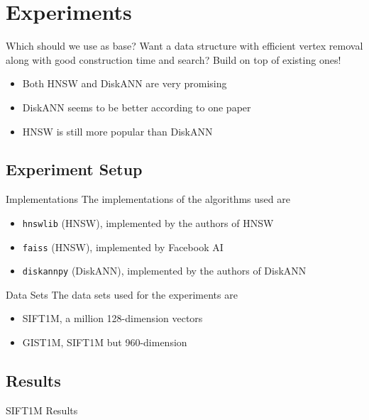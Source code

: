 \section{Experiments}

\begin{frame}{Which should we use as base?}
    Want a data structure with efficient vertex removal along with good construction time and search? Build on top of existing ones!
    \begin{itemize}
        \item Both HNSW and DiskANN are very promising 
        \item DiskANN seems to be better according to one paper
        \item HNSW is still more popular than DiskANN
    \end{itemize}
\end{frame}

\subsection{Experiment Setup}

\begin{frame}{Implementations}
    The implementations of the algorithms used are
    \begin{itemize}
        \item \texttt{hnswlib} (HNSW), implemented by the authors of HNSW
        \item \texttt{faiss} (HNSW), implemented by Facebook AI
        \item \texttt{diskannpy} (DiskANN), implemented by the authors of DiskANN
    \end{itemize}
\end{frame}

\begin{frame}{Data Sets}
    The data sets used for the experiments are
    \begin{itemize}
        \item SIFT1M, a million 128-dimension vectors
        \item GIST1M, SIFT1M but 960-dimension
    \end{itemize}
\end{frame}

\subsection{Results}

\begin{frame}{SIFT1M Results}
    
\end{frame}

